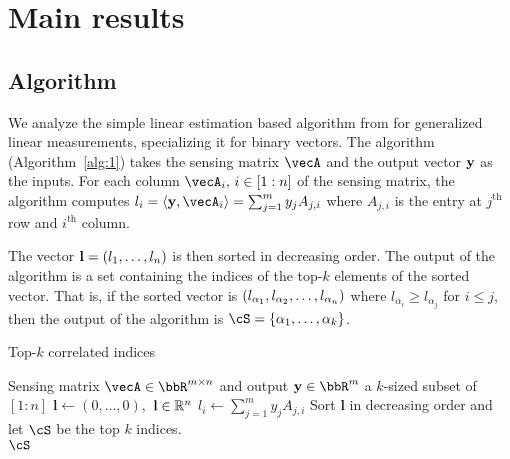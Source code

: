 \section{Main results}


\subsection{Algorithm}\label{sec:alg}
We analyze the simple linear estimation based algorithm from \cite{vershyninPlan} for generalized linear measurements, specializing it for binary vectors.
The algorithm (Algorithm~\ref{alg:1}) takes the sensing matrix $\vecA$ and the output vector $\mathbf{y}$ as the inputs. 
For each column $\vecA_i,\, i\in [1:n]$ of the sensing matrix, the algorithm computes $l_i = \ipr{\by}{\vecA_i} = \sum_{j = 1}^{m}y_jA_{j,i}$ where $A_{j,i}$ is the entry at $j^{\text{th}}$ row and $i^{\text{th}}$ column.

The vector $\mathbf{l} = \left(l_1, \ldots, l_n\right)$ is then sorted in decreasing order. The output of the algorithm is a set containing the indices of the top-$k$ elements of the sorted vector. That is, if the sorted vector is $\left(l_{\alpha_1}, l_{\alpha_2}, \ldots, l_{\alpha_n}\right)$ where $l_{\alpha_i}\geq l_{\alpha_j}$ for $i\leq j$, then the output of the algorithm is  $\cS = \inb{\alpha_1, \ldots, \alpha_k}$.



\begin{algorithm}[tbh!]
   \caption{Top-$k$ correlated indices}
   \label{alg:1}
\begin{algorithmic}
    Sensing matrix $\vecA\in \bbR^{m\times n}$ and output $\mathbf{y}\in \bbR^{m}$ 
    a $k$-sized subset of $[1:n]$
   \STATE $\mathbf{l} \gets (0, \ldots, 0)$,\, $\mathbf{l}\in {\mathbb R}^n$
      \STATE $l_i \gets \sum_{j = 1}^{m}y_jA_{j,i}$ 
    \ENDFOR
    \STATE Sort $\mathbf{l}$ in decreasing order and let $\cS$ be the top $k$ indices.\\
     $\mathcal{\cS}$ 
\end{algorithmic}
\end{algorithm}


